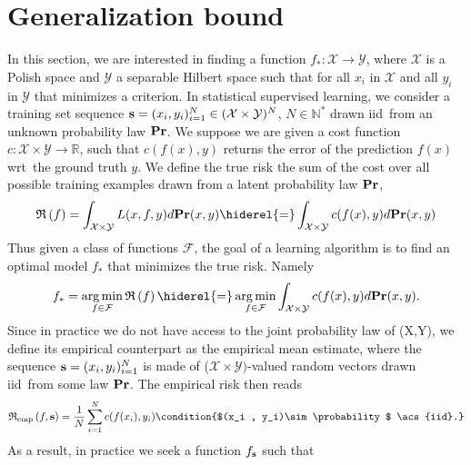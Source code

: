 
\section{Generalization bound}
\label{sec:generalization_bound}
In this section, we are interested in finding a function
$f_*:\mathcal{X}\to\mathcal{Y}$, where $\mathcal{X}$ is a Polish space and
$\mathcal{Y}$ a separable Hilbert space such that for all $x_i$ in
$\mathcal{X}$ and all $y_i$ in $\mathcal{Y}$ that minimizes a criterion. In
statistical supervised learning, we consider a training set sequence
$\boldsymbol{\mathbf{s}}=(x_i,y_i)_{i=1}^N\in(\mathcal{X}\times\mathcal{Y})^N$,
$N\in\mathbb{N^*}$ drawn \acs{iid}~from an unknown probability law
${\mathbf{{Pr}}}$. We suppose we are given a cost function
$c:\mathcal{X}\times\mathcal{Y}\to\mathbb{R}$, such that $c(f(x),y)$ returns
the error of the prediction $f(x)$ \acs{wrt}~the ground truth $y$. We define
the true risk the sum of the cost over all possible training examples drawn
from a latent probability law ${\mathbf{{Pr}}}$,
\begin{dmath*}
    \risk{f}=\int_{\mathcal{X}\times\mathcal{Y}}L(x,f,y)d\probability(x,y)
    \hiderel{=}\int_{\mathcal{X}\times\mathcal{Y}}c(f(x), y)d\probability(x,y)
\end{dmath*}
Thus given a class of functions $\mathcal{F}$, the goal of a learning algorithm
is to find an optimal model $f_*$ that minimizes the true risk. Namely
\begin{dmath*}
    f_* = \argmin_{f\in\mathcal{F}} \risk{f}
    \hiderel{=}\argmin_{f\in\mathcal{F}}\int_{\mathcal{X} \times
    \mathcal{Y}}c(f(x), y)d\probability(x,y).
\end{dmath*}
Since in practice we do not have access to the joint probability law of (X,Y),
we define its empirical counterpart as the empirical mean estimate, where the
sequence $\boldsymbol{\mathbf{s}}=(x_i,y_i)_{i=1}^N$ is made of
($\mathcal{X}\times\mathcal{Y})$-valued random vectors drawn \acs{iid}~from
some law
${\mathbf{{Pr}}}$.
The empirical risk then reads
\begin{dmath*}
    \riskemp{f, \seq{s}}=\frac{1}{N}\sum_{i=1}^Nc(f(x_i),y_i) \condition{$(x_i
    , y_i)\sim \probability$ \acs{iid}.}
\end{dmath*}
As a result, in practice we seek a function $f_{\boldsymbol{\mathbf{s}}}$ such that
